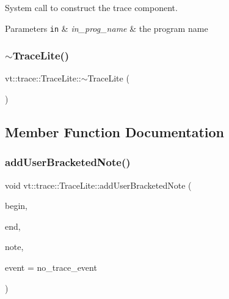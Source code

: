 System call to construct the trace component. 


\begin{DoxyParams}[1]{Parameters}
\mbox{\tt in}  & {\em in\+\_\+prog\+\_\+name} & the program name \\
\hline
\end{DoxyParams}
\mbox{\label{structvt_1_1trace_1_1_trace_lite_a08eca22659dc1f361d534c2b9c03b90b}} 
\subsubsection{\texorpdfstring{$\sim$\+Trace\+Lite()}{~TraceLite()}}
{\footnotesize\ttfamily vt\+::trace\+::\+Trace\+Lite\+::$\sim$\+Trace\+Lite (\begin{DoxyParamCaption}{ }\end{DoxyParamCaption})\hspace{0.3cm}{\ttfamily [virtual]}}



\subsection{Member Function Documentation}
\mbox{\label{structvt_1_1trace_1_1_trace_lite_aac43836481f9848a210f935837167bc5}} 
\subsubsection{\texorpdfstring{add\+User\+Bracketed\+Note()}{addUserBracketedNote()}}
{\footnotesize\ttfamily void vt\+::trace\+::\+Trace\+Lite\+::add\+User\+Bracketed\+Note (\begin{DoxyParamCaption}\item[{double const}]{begin,  }\item[{double const}]{end,  }\item[{std\+::string const \&}]{note,  }\item[{\hyperlink{namespacevt_1_1trace_a64a7185f3e102df8d8258f263ccd1582}{Trace\+Event\+I\+D\+Type} const}]{event = {\ttfamily no\+\_\+trace\+\_\+event} }\end{DoxyParamCaption})}



